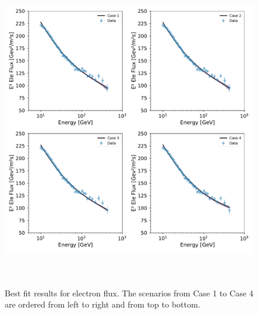 \documentclass[a4paper,11pt]{article}
\begin{document}
\begin{figure}[htb]
\begin{center}
\includegraphics[height=14cm,width=14cm,angle=0]{Figures/pymultinest_fit_case_5_electron_flux.pdf}
\caption{Best fit results for electron flux. The scenarios from Case 1 to Case 4 are ordered from left to right and from top to bottom.}
\label{fig:bf-electron-spectrum}
\end{center}
\end{figure}

\clearpage


\end{document}
